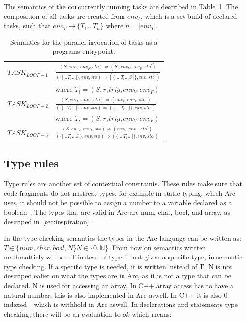 The semantics of the concurrently running tasks are described in Table~\ref{tab:taskinvocation}. The composition of all tasks are created from $env_T$, which is a set build of declared tasks, such that $env_T \rightarrow \{T_1 \dots T_n \}$ where $n = |env_T|$.


\begin{table}[htb!]
    \centering
    \begin{tabular}{ll}
        \toprule
        $TASK_{LOOP-1}$ & $\frac
            {(S, env_V, env_F, sto) \Rightarrow (S^\prime, env_V, env_F, sto^\prime)}
            {(\{|\dots T_i \dots|\}, env, sto) \Rightarrow (\{|\dots T_i \dots S^\prime|\}, env, sto^\prime)}$ \\ [12pt]
                        & where $T_i = (S, r, trig, env_V, env_F)$                                             \\ [12pt]
        $TASK_{LOOP-2}$ & $\frac
            {(S, env_V, env_F, sto) \Rightarrow (env_V, env_F, sto^\prime)}
            {(\{|\dots T_i \dots|\}, env, sto) \Rightarrow (\{|\dots T_i \dots|\}, env, sto^\prime)}$          \\ [12pt]
                        & where $T_i = (S, r, trig, env_V, env_F)$                                             \\ [12pt]
        $TASK_{LOOP-3}$ & $\frac
            {(S, env_V, env_F, sto) \Rightarrow (env_V, env_F, sto^\prime)}
            {(\{|\dots T_i \dots S|\}, env, sto) \Rightarrow (\{|\dots T_i \dots|\}, env, sto^\prime)}$        \\
        \bottomrule
    \end{tabular}
    \caption{Semantics for the parallel invocation of tasks as a programs entrypoint.}
    \label{tab:taskinvocation}
\end{table}



\subsection{Type rules}\label{subsec:typerules}
Type rules are another set of contextual constraints. These rules make sure that code fragments do not mistreat types, for example in static typing, which Arc uses, it should not be possible to assign a number to a variable declared as a boolean~\cite{Sebesta2016}. The types that are valid in Arc are num, char, bool, and array, as descriped in~\ref{sec:inspiration}.

In the type checking semantics the types in the Arc language can be written as:
$T \in \{num, char, bool, N\} N \in \{ 0,\mathbb{N}\}$.
From now on semantics written mathmatticly will use T instead of type, if not given a specific type, in semantic type checking. If a specific type is needed, it is written instead of T.
N is not descriped ealier on what the types are in Arc, as it is not a type that can be declared. N is used for accessing an array, In C++ array access has to have a natural number, this is also implemented in Arc aswell. In C++ it is also 0-indexed~\cite{cppreferenceDataTypes}, which is withhold in Arc aswell.
In declarations and statements type checking, there will be an evaluation to $ok$ which means:

